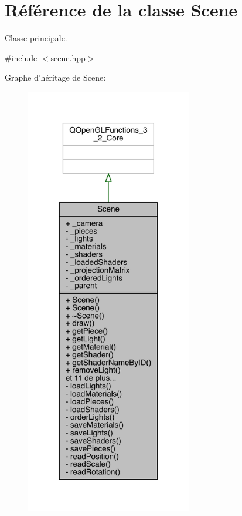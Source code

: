 \hypertarget{class_scene}{\section{Référence de la classe Scene}
\label{class_scene}
}


Classe principale.  




{\ttfamily \#include $<$scene.\+hpp$>$}



Graphe d'héritage de Scene\+:
\nopagebreak
\begin{figure}[H]
\begin{center}
\leavevmode
\includegraphics[width=206pt]{class_scene__inherit__graph}
\end{center}
\end{figure}



